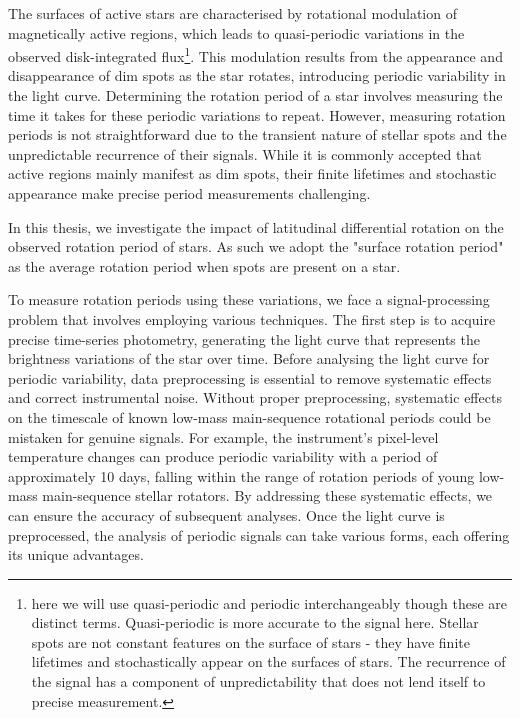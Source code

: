 The surfaces of active stars are characterised by rotational modulation of magnetically active regions, which leads to quasi-periodic variations in the observed disk-integrated flux\footnote{here we will use quasi-periodic and periodic interchangeably though these are distinct terms. Quasi-periodic is more accurate to the signal here. Stellar spots are not constant features on the surface of stars - they have finite lifetimes and stochastically appear on the surfaces of stars. The recurrence of the signal has a component of unpredictability that does not lend itself to precise measurement.}. 
This modulation results from the appearance and disappearance of dim spots as the star rotates, introducing periodic variability in the light curve. Determining the rotation period of a star involves measuring the time it takes for these periodic variations to repeat.
However, measuring rotation periods is not straightforward due to the transient nature of stellar spots and the unpredictable recurrence of their signals. While it is commonly accepted that active regions mainly manifest as dim spots, their finite lifetimes and stochastic appearance make precise period measurements challenging.

In this thesis, we investigate the impact of latitudinal differential rotation on the observed rotation period of stars.
As such we adopt the "surface rotation period" as the average rotation period when spots are present on a star.

To measure rotation periods using these variations, we face a signal-processing problem that involves employing various techniques. 
The first step is to acquire precise time-series photometry, generating the light curve that represents the brightness variations of the star over time.
 Before analysing the light curve for periodic variability, data preprocessing is essential to remove systematic effects and correct instrumental noise. 
 Without proper preprocessing, systematic effects on the timescale of known low-mass main-sequence rotational periods could be mistaken for genuine signals.
For example, the \kepler{} instrument's pixel-level temperature changes can produce periodic variability with a period of approximately 10 days, falling within the range of rotation periods of young low-mass main-sequence stellar rotators. By addressing these systematic effects, we can ensure the accuracy of subsequent analyses.
Once the light curve is preprocessed, the analysis of periodic signals can take various forms, each offering its unique advantages. 

